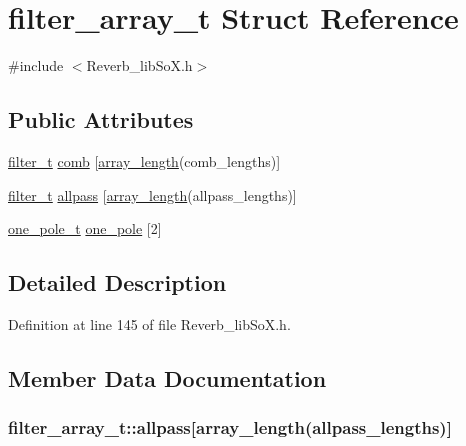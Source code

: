 \hypertarget{structfilter__array__t}{}\section{filter\+\_\+array\+\_\+t Struct Reference}
\label{structfilter__array__t}


{\ttfamily \#include $<$Reverb\+\_\+lib\+So\+X.\+h$>$}

\subsection*{Public Attributes}
\begin{DoxyCompactItemize}
\item 
\hyperlink{structfilter__t}{filter\+\_\+t} \hyperlink{structfilter__array__t_a9efeba7af9f282455103e36dbd863cf2}{comb} \mbox{[}\hyperlink{_reverb__lib_so_x_8h_a9af157c53b7f125d10e0ff736c0d7d75}{array\+\_\+length}(comb\+\_\+lengths)\mbox{]}
\item 
\hyperlink{structfilter__t}{filter\+\_\+t} \hyperlink{structfilter__array__t_adb690f1c48c9d87805d770d084264943}{allpass} \mbox{[}\hyperlink{_reverb__lib_so_x_8h_a9af157c53b7f125d10e0ff736c0d7d75}{array\+\_\+length}(allpass\+\_\+lengths)\mbox{]}
\item 
\hyperlink{structone__pole__t}{one\+\_\+pole\+\_\+t} \hyperlink{structfilter__array__t_ab87070871f23455e085f6dc6d1d1fa6c}{one\+\_\+pole} \mbox{[}2\mbox{]}
\end{DoxyCompactItemize}


\subsection{Detailed Description}


Definition at line 145 of file Reverb\+\_\+lib\+So\+X.\+h.



\subsection{Member Data Documentation}
\subsubsection[{\texorpdfstring{allpass}{allpass}}]{ filter\+\_\+array\+\_\+t\+::allpass\mbox{[}{\bf array\+\_\+length}(allpass\+\_\+lengths)\mbox{]}}\hypertarget{structfilter__array__t_adb690f1c48c9d87805d770d084264943}{}\label{structfilter__array__t_adb690f1c48c9d87805d770d084264943}


